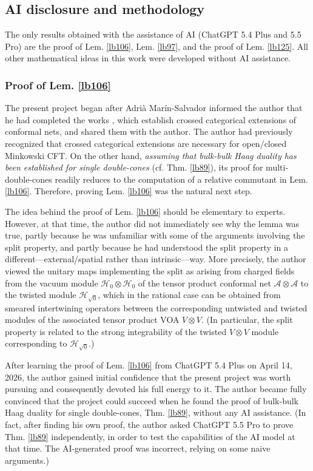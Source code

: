 \documentclass[11pt,b5paper,notitlepage]{article}
\theoremstyle{definition}
\theoremstyle{plain}
\newcommand{\MA}{\mathcal A}
\newcommand{\MH}{\mathcal H}
\numberwithin{equation}{section}
\begin{document}
\subsection{AI disclosure and methodology}

The only results obtained with the assistance of AI (ChatGPT 5.4 Plus and 5.5 Pro) are the proof of Lem. \ref{lb106}, Lem. \ref{lb97}, and the proof of Lem. \ref{lb125}. All other mathematical ideas in this work were developed without AI assistance.

\subsubsection*{Proof of Lem. \ref{lb106}}



The present project began after Adri\`a Mar\'in-Salvador informed the author that he had completed the works \cite{MS26a,MS26b}, which establish crossed categorical extensions of conformal nets, and shared them with the author. The author had previously recognized that crossed categorical extensions are necessary for open/closed Minkowski CFT. On the other hand, \textit{assuming that bulk-bulk Haag duality has been established for single double-cones} (cf. Thm. \ref{lb89}), its proof for multi-double-cones readily reduces to the computation of a relative commutant in Lem. \ref{lb106}. Therefore, proving Lem. \ref{lb106} was the natural next step.


The idea behind the proof of Lem. \ref{lb106} should be elementary to experts. However, at that time, the author did not immediately see why the lemma was true, partly because he was unfamiliar with some of the arguments involving the split property, and partly because he had understood the split property in a different---external/spatial rather than intrinsic---way. More precisely, the author viewed the unitary maps implementing the split as arising from charged fields from the vacuum module $\MH_0\otimes\MH_0$ of the tensor product conformal net $\MA\otimes\MA$ to the twisted module $\MH_{\sqrt0}$, which in the rational case can be obtained from smeared intertwining operators between the corresponding untwisted and twisted modules of the associated tensor product VOA $V\otimes V$. (In particular, the split property is related to the strong integrability of the twisted $V\otimes V$ module corresponding to $\MH_{\sqrt0}$.)


After learning the proof of Lem. \ref{lb106} from ChatGPT 5.4 Plus on April 14, 2026, the author gained initial confidence that the present project was worth pursuing and consequently devoted his full energy to it. The author became fully convinced that the project could succeed when he found the proof of bulk-bulk Haag duality for single double-cones, Thm. \ref{lb89}, without any AI assistance. (In fact, after finding his own proof, the author asked ChatGPT 5.5 Pro to prove Thm. \ref{lb89} independently, in order to test the capabilities of the AI model at that time. The AI-generated proof was incorrect, relying on some naive arguments.)
\end{document}
